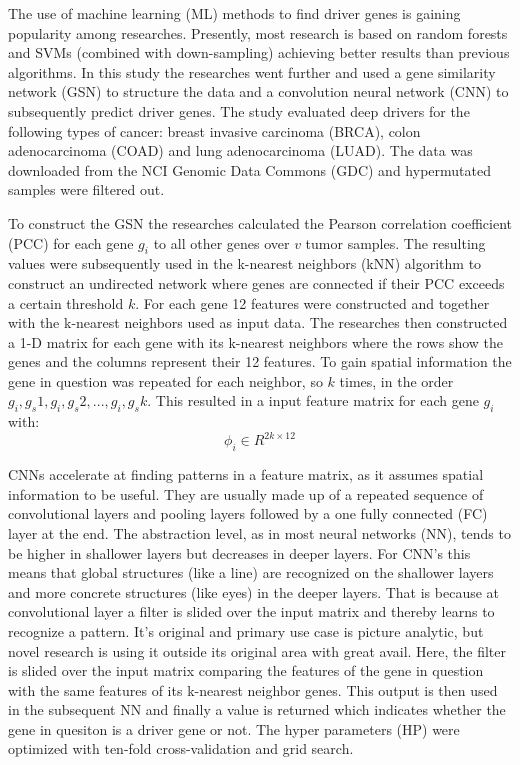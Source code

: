 \documentclass{article}
\begin{document}
The use of machine learning (ML) methods to find driver genes is gaining popularity among researches. Presently, most research is based on random forests and SVMs (combined with down-sampling) achieving better results than previous algorithms.
In this study the researches went further and used a gene similarity network (GSN) to structure the data and a convolution neural network (CNN) to subsequently predict driver genes. The study evaluated deep drivers for the following types of cancer: breast invasive carcinoma (BRCA), colon adenocarcinoma (COAD) and lung adenocarcinoma (LUAD). The data was downloaded from the NCI Genomic Data Commons (GDC) and hypermutated samples were filtered out.

To construct the GSN the researches calculated the Pearson correlation coefficient (PCC) for each gene $g_i$ to all other genes over $v$ tumor samples.
The resulting values were subsequently used in the k-nearest neighbors (kNN) algorithm to construct an undirected network where genes are connected if their PCC exceeds a certain threshold $k$. For each gene 12 features were constructed and together with the k-nearest neighbors used as input data. The researches then constructed a 1-D matrix for each gene with its k-nearest neighbors where the rows show the genes and the columns represent their 12 features. To gain spatial information the gene in question was repeated for each neighbor, so $k$ times, in the order $g_i, g_s1,g_i,g_s2, ... , g_i,g_sk$. This resulted in a input feature matrix for each gene $g_i$ with:
\begin{equation}
\phi_i \in R^{2k \times 12}
\end{equation}

CNNs accelerate at finding patterns in a feature matrix, as it assumes spatial information to be useful. They are usually made up of a repeated sequence of convolutional layers and pooling layers followed by a one fully connected (FC) layer at the end. The abstraction level, as in most neural networks (NN), tends to be higher in shallower layers but decreases in deeper layers. For CNN's this means that global structures (like a line) are recognized on the shallower layers and more concrete structures (like eyes) in the deeper layers. That is because at convolutional layer a filter is slided over the input matrix and thereby learns to recognize a pattern. It's original and primary use case is picture analytic, but novel research is using it outside its original area with great avail. Here, the filter is slided over the input matrix comparing the features of the gene in question with the same features of its k-nearest neighbor genes. This output is then used in the subsequent NN and finally a value is returned which indicates whether the gene in quesiton is a driver gene or not. The hyper parameters (HP) were optimized with ten-fold cross-validation and grid search.
\end{document}
